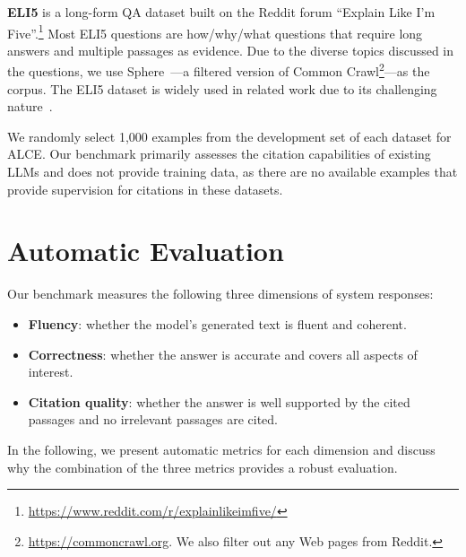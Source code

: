 \documentclass[11pt]{article}
\newcommand\tf[1]{\textbf{#1}}
\newcommand{\citeeval}{ALCE}
\begin{document}
\textbf{ELI5} \cite{fan-etal-2019-eli5} 
is a long-form QA dataset built on the Reddit forum ``Explain Like I'm Five''.\footnote{\url{https://www.reddit.com/r/explainlikeimfive/}} %
Most ELI5 questions are how/why/what questions that require long answers and multiple passages as evidence.
Due to the diverse topics discussed in the questions, we use
Sphere~\cite{piktus2021web}---a filtered version of Common Crawl\footnote{\url{https://commoncrawl.org}. We also filter out any Web pages from Reddit. }---as the corpus. %
The ELI5 dataset is widely used in related work due to its challenging nature~\cite{nakano2021webgpt,menick2022teaching,liu2023evaluating}.



We randomly select 1,000 examples from the development set of each dataset for \citeeval{}.
Our benchmark primarily assesses the citation capabilities of existing LLMs and does not provide training data,
as
there are no available examples that provide supervision for citations
in these datasets.







\section{Automatic Evaluation}




\vspace{-3pt}
Our benchmark measures the following three dimensions of system responses:
\vspace{-3pt}
\begin{itemize}[leftmargin=1em,itemsep=0pt]
    \item \tf{Fluency}: whether the model's generated text is fluent and coherent.
    \item \tf{Correctness}: whether the answer is accurate and covers all aspects of interest.
    \item \tf{Citation quality}: whether the answer is well supported by the cited passages and no irrelevant passages are cited.
\end{itemize}
\vspace{-3pt}
In the following, we present automatic metrics for each dimension 
and discuss why the combination of the three metrics provides a robust evaluation. %
\end{document}

